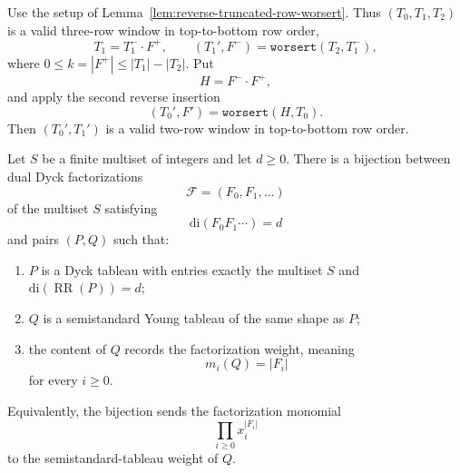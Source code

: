 \documentclass[10pt,a4paper]{amsart}
\newcommand{\di}{\mathrm{di}}
\newcommand{\worsert}{\texttt{worsert}}
\begin{document}
\begin{lemma}
\label{lem:second-reverse-insertion-valid-two-row}
Use the setup of Lemma~\ref{lem:reverse-truncated-row-worsert}.  Thus
\((T_0,T_1,T_2)\) is a valid three-row window in top-to-bottom row order,
\[
  T_1=T_1^-\cdot F^+,
  \qquad
  (T_1',F^-)=\worsert(T_2,T_1^-),
\]
where \(0\le k=|F^+|\le |T_1|-|T_2|\).  Put
\[
  H=F^-\cdot F^+,
\]
and apply the second reverse insertion
\[
  (T_0',F')=\worsert(H,T_0).
\]
Then \((T_0',T_1')\) is a valid two-row window in top-to-bottom row order.
\end{lemma}

\begin{theorem}
\label{thm:tableau-factorization-bijection}
Let \(S\) be a finite multiset of integers and let \(d\ge 0\).  There is a
bijection between dual Dyck factorizations
\[
  \mathcal F=(F_0,F_1,\ldots)
\]
of the multiset \(S\) satisfying
\[
  \di(F_0F_1\cdots)=d
\]
and pairs \((P,Q)\) such that:
\begin{enumerate}[label=(\roman*)]
\item \(P\) is a Dyck tableau with entries exactly the multiset \(S\) and
      \(\di(\operatorname{RR}(P))=d\);
\item \(Q\) is a semistandard Young tableau of the same shape as \(P\);
\item the content of \(Q\) records the factorization weight, meaning
      \[
        m_i(Q)=|F_i|
      \]
      for every \(i\ge 0\).
\end{enumerate}
Equivalently, the bijection sends the factorization monomial
\[
  \prod_{i\ge 0}x_i^{|F_i|}
\]
to the semistandard-tableau weight of \(Q\).
\end{theorem}
\end{document}

